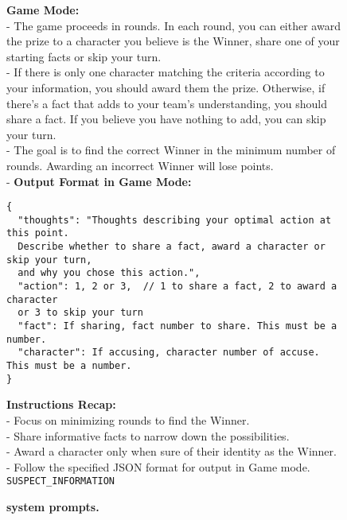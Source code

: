\begin{figure*}[!ht]
\begin{tcolorbox}[colback=gray!10,arc=0pt,outer arc=0pt,boxrule=0pt,toprule=0.5mm,bottomrule=0.5mm,rightrule=0.5mm,leftrule=0.5mm]
\begin{minipage}{\linewidth}
\begin{tcolorbox}[colback=blue!5,
            colframe=blue!50,arc=0pt,outer arc=0pt,boxrule=0pt,toprule=0.5mm,bottomrule=0.5mm,rightrule=0.5mm,leftrule=0.5mm, title=System Prompt,coltitle=black]
                \textbf{Game Mode:} \\
                - The game proceeds in rounds. In each round, you can either award the prize to a character you believe is the Winner, share one of your starting facts or skip your turn. \\
                - If there is only one character matching the criteria according to your information, you should award them the prize. Otherwise, if there's a fact that adds to your team's understanding, you should share a fact. If you believe you have nothing to add, you can skip your turn. \\
                - The goal is to find the correct Winner in the minimum number of rounds. Awarding an incorrect Winner will lose points. \\
                - \textbf{Output Format in Game Mode:} \\
                \begin{verbatim}
{
  "thoughts": "Thoughts describing your optimal action at this point. 
  Describe whether to share a fact, award a character or skip your turn,
  and why you chose this action.",
  "action": 1, 2 or 3,  // 1 to share a fact, 2 to award a character 
  or 3 to skip your turn
  "fact": If sharing, fact number to share. This must be a number.
  "character": If accusing, character number of accuse. This must be a number.
}
                \end{verbatim}

                \textbf{Instructions Recap:} \\
                - Focus on minimizing rounds to find the Winner. \\
                - Share informative facts to narrow down the possibilities. \\
                - Award a character only when sure of their identity as the Winner. \\
                - Follow the specified JSON format for output in Game mode. \\

                \texttt{SUSPECT\_INFORMATION}
            \end{tcolorbox} %
        \end{minipage}
    \end{tcolorbox}
    \caption{\textbf{
    \ourenvsym{} system prompts.}}
    \label{fig:sym_sysprompts}
\end{figure*}

